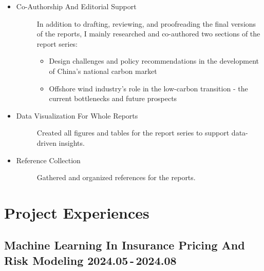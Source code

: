 \documentclass[a4paper]{article}
\begin{document}
\begin{itemize}
    \item \begin{description}
        \item[Co-Authorship And Editorial Support] In addition to drafting, reviewing, and proofreading the final versions of the reports, I mainly researched and co-authored two sections of the report series:
        \begin{itemize}
            \item Design challenges and policy recommendations in the development of China's national carbon market
            \item Offshore wind industry’s role in the low-carbon transition - the current bottlenecks and future prospects
        \end{itemize}
    \end{description}
    \item \begin{description}
        \item[Data Visualization For Whole Reports] Created all figures and tables for the report series to support data-driven insights.
    \end{description} 
    \item \begin{description}
        \item[Reference Collection] Gathered and organized references for the reports. 
    \end{description}
\end{itemize}

\hypertarget{project-exp}{
    \section{Project Experiences}
}
\hypertarget{integrated-project}{
    \subsection{Machine Learning In Insurance Pricing And Risk Modeling \normalfont \hfill 2024.05\,-\,2024.08} 
}
\end{document}
